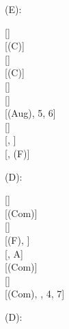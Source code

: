 \documentclass[a4paper,english,fleqn,11pt,final]{scrartcl}
\newcommand{\negg}{{\sim}}
\newcommand{\limp}{\multimap}
\newcommand{\timp}{\rightarrowtriangle}
\newcommand{\tens}{\otimes}
\newcommand{\Deriv}[1]{{\normalfont\textsf{#1}}}
\newcommand{\oland}{\owedge}
\theoremstyle{plain}
\theoremstyle{definition}
\newcommand{\thm}{\text{\scriptsize\; (thm)}}
\begin{document}
{\begin{minipage}[t][][b]{.46\textwidth}
\Deriv{(E)}:

\medskip

{
\setlength{\fitchprfwidth}{1.6in}
\fitchprf{
\pline[A ]{\top \limp (\neg \alpha \timp \alpha)}
}
{
	\pline[1 ]{\top \limp \negg\negg(\neg \alpha \timp \alpha)}[]\\
	\pline[2 ]{\negg (\neg \alpha \timp \alpha) \limp \negg \top}[\Deriv{(C)}]\\
	\pline[3 ]{\negg (\neg \alpha \timp \alpha) \limp \negg \alpha}[]\\
	\pline[4 ]{\alpha \limp \negg\negg (\neg \alpha \timp \alpha)}[\Deriv{(C)}]\\
	\pline[5 ]{\alpha \limp  (\neg \alpha \timp \alpha)}[]\\
	\pline[6 ]{\alpha \tens \neg \alpha \thm}[]\\
	\pline[7 ]{\alpha \tens (\neg \alpha \oland (\neg \alpha \timp \alpha))}[\Deriv{(Aug)}, 5, 6]\\
	\pline[8 ]{\alpha \tens (\alpha \oland \neg \alpha)}[]\\
	\pline[9 ]{\alpha \tens \bot}[, ]\\
	\pline[\slider]{\alpha}[, \Deriv{(F)}]
}
}
\end{minipage}

\bigskip

\begin{minipage}[t][][b]{.43\textwidth}

\Deriv{(D)}:

\medskip

{
\setlength{\fitchprfwidth}{1.15in}
\fitchprf{
\pline[A ]{(\alpha \oland \varphi) \tens (\alpha \oland \psi)}
}
{
	\pline[1 ]{(\alpha \oland \varphi) \tens \alpha}[]\\
	\pline[2 ]{\alpha \tens (\alpha \oland \varphi)}[\Deriv{(Com)}]\\
	\pline[3 ]{\alpha \tens \alpha}[]\\
	\pline[4 ]{\alpha}[\Deriv{(F)}, ]\\
	\pline[5 ]{(\alpha \oland \varphi) \tens \psi}[, A]\\
	\pline[6 ]{\psi \tens (\alpha \oland \varphi)}[\Deriv{(Com)}]\\
	\pline[7 ]{\psi \tens \varphi}[]\\
	\pline[\slider]{\alpha \oland (\varphi \tens \psi)}[\Deriv{(Com)}, , 4, 7]
}
}
\end{minipage}
\begin{minipage}[t][][b]{.46\textwidth}

\Deriv{(D)}:


\end{minipage}}
\end{document}
